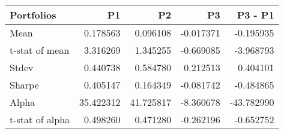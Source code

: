 \begin{tabular}{lrrrr}
\toprule
Portfolios & P1 & P2 & P3 & P3 - P1 \\
\midrule
Mean & 0.178563 & 0.096108 & -0.017371 & -0.195935 \\
t-stat of mean & 3.316269 & 1.345255 & -0.669085 & -3.968793 \\
Stdev & 0.440738 & 0.584780 & 0.212513 & 0.404101 \\
Sharpe & 0.405147 & 0.164349 & -0.081742 & -0.484865 \\
Alpha & 35.422312 & 41.725817 & -8.360678 & -43.782990 \\
t-stat of alpha & 0.498260 & 0.471280 & -0.262196 & -0.652752 \\
\bottomrule
\end{tabular}
